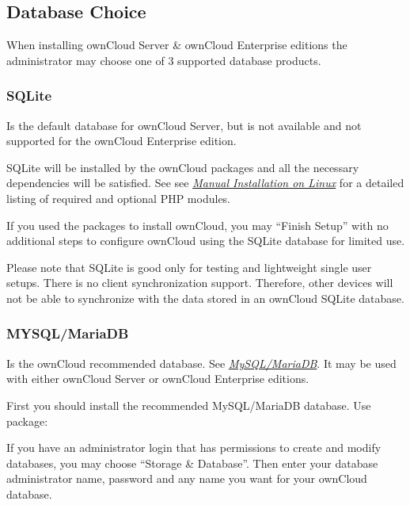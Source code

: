 \documentclass[letterpaper,10pt,english]{sphinxmanual}
\begin{document}
\subsection{Database Choice}
\label{installation/installation_wizard:database-choice-label}\label{installation/installation_wizard:database-choice}
When installing ownCloud Server \& ownCloud Enterprise editions the administrator
may choose one of 3 supported database products.


\subsubsection{SQLite}
\label{installation/installation_wizard:sqlite}
Is the default database for ownCloud Server, but is not available and not supported
for the ownCloud Enterprise edition.

SQLite will be installed by the ownCloud packages and all the necessary dependencies
will be satisfied.  See see {\hyperref[installation/source_installation::doc]{\emph{Manual Installation on Linux}}} for a detailed listing of
required and optional PHP modules.

If you used the packages to install ownCloud, you may ``Finish Setup'' with no
additional steps to configure ownCloud using the SQLite database for limited use.

Please note that SQLite is good only for testing and lightweight single user setups.
There is no client synchronization support.  Therefore, other devices will not be able
to synchronize with the data stored in an ownCloud SQLite database.


\subsubsection{MYSQL/MariaDB}
\label{installation/installation_wizard:mysql-mariadb}
Is the ownCloud recommended database. See {\hyperref[installation/system_requirements::doc]{\emph{MySQL/MariaDB}}}.
It may be used with either ownCloud Server or ownCloud Enterprise editions.
\begin{description}
\item[{First you should install the recommended MySQL/MariaDB database.  Use package:}] \leavevmode
{}

\end{description}

If you have an administrator login that has permissions to create and modify databases,
you may choose ``Storage \& Database''.  Then enter your database administrator name,
password and any name you want for your ownCloud database.
\end{document}

